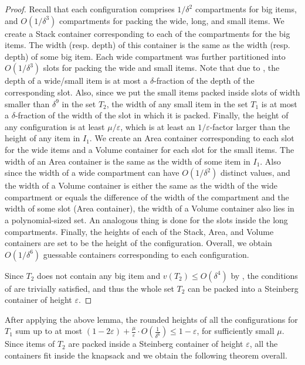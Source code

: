 \documentclass[10pt,a4paper]{amsart}
\newcommand{\eps}{\varepsilon}
\renewcommand{\epsilon}{\varepsilon} %
\theoremstyle{definition}
\begin{document}
\begin{proof}
Recall that each configuration comprises $1/\delta^2$ compartments for big items, and $O(1/\delta^3)$ compartments for packing the wide, long, and small items. We create a Stack container corresponding to each of the compartments for the big items. The width (resp. depth) of this container is the same as the width (resp. depth) of some big item. Each wide compartment was further partitioned into $O(1/\delta^3)$ slots for packing the wide and small items. Note that due to , the depth of a wide/small item is at most a $\delta$-fraction of the depth of the corresponding slot. Also, since we put the small items packed inside slots of width smaller than $\delta^9$ in the set $T_2$, the width of any small item in the set $T_1$ is at most a $\delta$-fraction of the width of the slot in which it is packed. Finally, the height of any configuration is at least $\mu/\epsilon$, which is at least an $1/\epsilon$-factor larger than the height of any item in $I_1$. We create an Area container corresponding to each slot for the wide items and a Volume container for each slot for the small items. The width of an Area container is the same as the width of some item in $I_1$. Also since the width of a wide compartment can have  $O(1/\delta^2)$ distinct values, and the width of a Volume container is either the same as the width of the wide compartment or equals the difference of the width of the compartment and the width of some slot (Area container), the width of a Volume container also lies in a polynomial-sized set. An analogous thing is done for the slots inside the long compartments. Finally, the heights of each of the  Stack, Area, and Volume containers are set to be the height of the configuration. Overall, we obtain $O(1/\delta^6)$ guessable containers corresponding to each configuration.

Since $T_2$ does not contain any big item and $v(T_2)\le O(\delta^4)$ by , the conditions of  are trivially satisfied, and thus the whole set $T_2$ can be packed into a Steinberg container of height $\eps$.
\end{proof}






After applying the above lemma, the rounded heights of all the configurations for $T_1$ sum up to at most $(1-2\epsilon)+\frac{\mu}{\epsilon}\cdot O(\frac{1}{\delta^{6}}) \le 1-\eps$, for sufficiently small $\mu$. Since items of $T_2$ are packed inside a Steinberg container of height $\eps$, all the containers fit inside the knapsack and we obtain the following theorem overall.
\end{document}
